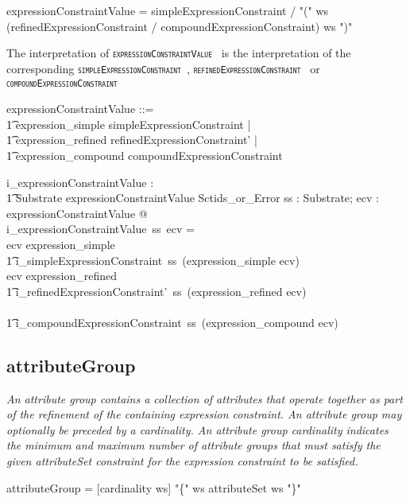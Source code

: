 \documentclass{article}
\def\spec#1{{\tt \small \textsc{{#1}} }}
\def\bnf#1{{\scriptsize {{#1}} }}
\def\desc#1{{\small \textsl{{#1}} }}
\begin{document}
\begin{framed}
\noindent
\bnf{expressionConstraintValue = simpleExpressionConstraint / "(" ws (refinedExpressionConstraint / compoundExpressionConstraint) ws ")"}
\end{framed}

The interpretation of \spec{expressionConstraintValue} is the interpretation of the corresponding \spec{simpleExpressionConstraint}, \spec{refinedExpressionConstraint} or
\spec{compoundExpressionConstraint}

\begin{zed}
expressionConstraintValue ::= \\
\t1 expression\_simple \ldata simpleExpressionConstraint \rdata | \\
\t1 expression\_refined \ldata refinedExpressionConstraint' \rdata | \\
\t1 expression\_compound \ldata compoundExpressionConstraint \rdata
\end{zed}

\begin{gendef}
   i\_expressionConstraintValue : \\
\t1 Substrate \fun expressionConstraintValue \fun Sctids\_or\_Error
\where
   \forall ss : Substrate; ecv : expressionConstraintValue @ \\
   i\_expressionConstraintValue~ss~ecv = \\
\IF ecv \in \ran expression\_simple  \THEN \\
\t1 i\_simpleExpressionConstraint~ss~(expression\_simple \inv ecv) \\
\ELSE \IF ecv \in \ran expression\_refined \THEN \\
\t1 i\_refinedExpressionConstraint'~ss~(expression\_refined \inv ecv) \\
\ELSE \\
\t1 i\_compoundExpressionConstraint~ss~(expression\_compound \inv ecv)
\end{gendef}



\subsection{attributeGroup}
\begin{framed}
\desc{An attribute group contains a collection of attributes that operate together as part of the refinement of the containing expression constraint. An attribute group may optionally be preceded by a cardinality. An attribute group cardinality indicates the minimum and maximum number of attribute groups that must satisfy the given attributeSet constraint for the expression constraint to be satisfied.}
\end{framed}
\begin{framed}
\noindent
\bnf{attributeGroup = [cardinality ws] "\{" ws attributeSet ws "\}"}
\end{framed}
\end{document}
